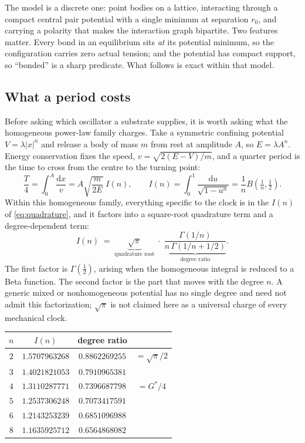 \documentclass[11pt,a4paper]{article}
\newcommand{\Gstar}{{G^{*}}}
\newcommand{\dd}{\mathrm{d}}
\theoremstyle{definition}
\theoremstyle{plain}
\theoremstyle{remark}
\begin{document}
The model is a discrete one: point bodies on a lattice, interacting
through a compact central pair potential with a single minimum at
separation $r_0$, and carrying a polarity that makes the interaction
graph bipartite. Two features matter. Every bond in an equilibrium sits
\emph{at} its potential minimum, so the configuration carries zero actual
tension; and the potential has compact support, so ``bonded'' is a sharp
predicate. What follows is exact within that model.

\subsection{What a period costs}
\label{sec:quadrature}

Before asking which oscillator a substrate supplies, it is worth asking
what the homogeneous power-law family charges. Take a symmetric confining potential
$V = \lambda|x|^n$ and release a body of mass $m$ from rest at amplitude
$A$, so $E = \lambda A^n$. Energy conservation fixes the speed,
$v = \sqrt{2(E-V)/m}$, and a quarter period is the time to cross from the
centre to the turning point:
\begin{equation}
\frac{T}{4} = \int_0^{A}\frac{\dd x}{v}
= A\sqrt{\frac{m}{2E}}\;I(n),
\qquad
I(n) = \int_0^1\frac{\dd u}{\sqrt{1-u^{n}}}
= \frac1n B\!\left(\tfrac1n,\tfrac12\right).
\label{eq:quadrature}
\end{equation}
Within this homogeneous family, everything specific to the clock is in
the $I(n)$ of \eqref{eq:quadrature}, and it factors into a square-root
quadrature term and a degree-dependent term:
\begin{equation}
I(n) \;=\; \underbrace{\sqrt{\pi}}_{\text{quadrature root}}
\;\cdot\;
\underbrace{\frac{\Gamma(1/n)}{n\,\Gamma(1/n+1/2)}}_{\text{degree ratio}} .
\label{eq:qrdr}
\end{equation}
The first factor is $\Gamma(\tfrac12)$, arising when the homogeneous
integral is reduced to a Beta function. The second factor is the part that
moves with the degree $n$. A generic mixed or nonhomogeneous potential has
no single degree and need not admit this factorization; $\sqrt\pi$ is not
claimed here as a universal charge of every mechanical clock.

\begin{center}
\small
\begin{tabular}{cccc}
\toprule
$n$ & $I(n)$ & degree ratio & \\
\midrule
$2$ & $1.5707963268$ & $0.8862269255$ & $=\sqrt\pi/2$ \\
$3$ & $1.4021821053$ & $0.7910965381$ & \\
$4$ & $1.3110287771$ & $0.7396687798$ & $=\Gstar/4$ \\
$5$ & $1.2537306248$ & $0.7073417591$ & \\
$6$ & $1.2143253239$ & $0.6851096988$ & \\
$8$ & $1.1635925712$ & $0.6564868082$ & \\
\bottomrule
\end{tabular}
\end{center}
\end{document}
